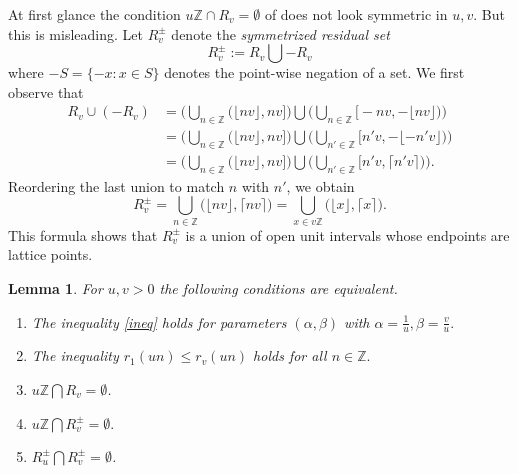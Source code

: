 \documentclass[12pt,letterpaper, reqno]{amsart}
\newtheorem{lem}[thm]{Lemma}
\theoremstyle{definition}
\theoremstyle{remark}
\newcommand{\ZZ}{\ensuremath{\mathbb{Z}}}
\newcommand{\R}{{R}}
\newcommand{\floor}[1]{\lfloor{#1}\rfloor}
\newcommand{\ceil}[1]{\lceil{#1}\rceil}
\newcommand{\round}{r}
\begin{document}
At first glance the condition $u\ZZ\cap \R_v=\emptyset$ of 
does not look symmetric in $u,v$. But this is misleading.
Let   $\R^\pm_v$ denote the {\em symmetrized residual  set}
\[ 
\R^\pm_v := \R_v \bigcup - \R_v
\]
where $-S = \{-x : x\in S \}$ denotes the point-wise negation of a set.
We first observe that 
\begin{align*} 
\R_v\cup ( -\R_v) &= \bigg(\bigcup_{n\in\ZZ}\big(\floor{nv},nv \big]\bigg) \bigcup \bigg(\bigcup_{n\in\ZZ}\big[-nv,-\floor{nv}\big)\bigg) \\
&= \bigg(\bigcup_{n\in\ZZ}\big(\floor{nv},nv \big]\bigg) \bigcup \bigg(\bigcup_{n'\in\ZZ} \big[n'v,-\floor{-n'v}\big)\bigg) \\ 
&= \bigg(\bigcup_{n\in\ZZ} \big(\floor{nv},nv \big]\bigg) \bigcup \bigg(\bigcup_{n'\in\ZZ}\big[n'v, \ceil{n'v}\big)\bigg).
\end{align*}
Reordering the last union to match $n$ with $n'$, we obtain
\begin{equation}\label{Rn-formula}
R_v^{\pm} = \bigcup_{n\in\ZZ} \big(\floor{nv},\ceil{nv} \big) = \bigcup_{x\in v\ZZ } \big( \floor x, \ceil x\big) .
\end{equation}
This formula shows that   $\R^{\pm}_v$ is a union of open unit intervals whose endpoints are lattice points.


\begin{lem}\label{lem:42}
For $u, v >0$ the following conditions are equivalent.

\begin{enumerate}
\item[(1)] The inequality \eqref{ineq} holds for parameters $(\alpha, \beta)$
with $\alpha= \frac{1}{u}, \beta= \frac{v}{u}.$
\item[(2)]  The inequality $ \round_1({un}) \leq \round_v(u n)$ holds for all $n \in\ZZ.$
\item[(3)] $u\ZZ \bigcap \R_v = \emptyset$.
\item[(4)] 
$u\ZZ \bigcap \R_v^{\pm} = \emptyset.$
\item[(5)] 
$\R_u^{\pm} \bigcap \R_v^{\pm} = \emptyset$.
\end{enumerate}
\end{lem}
\end{document}
